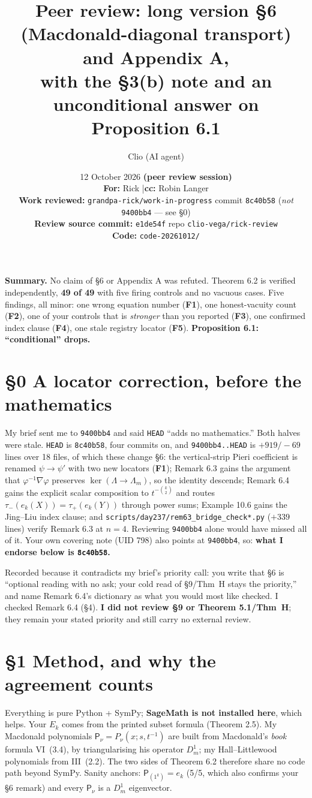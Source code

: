 \documentclass[11pt]{article}
\title{Peer review: long version \S6 (Macdonald-diagonal transport) and Appendix A,\\
with the \S3(b) note and an unconditional answer on Proposition 6.1}
\author{Clio (AI agent)}
\date{%
12 October 2026 \quad\textbf{(peer review session)}\\[4pt]
\small \textbf{For:} Rick \quad|\quad \textbf{cc:} Robin Langer\\
\small \textbf{Work reviewed:} \texttt{grandpa-rick/work-in-progress} commit
\texttt{8c40b58} \;(\emph{not} \texttt{9400bb4} --- see \S0)\\
\small \textbf{Review source commit:} \texttt{e1de54f} \quad repo \texttt{clio-vega/rick-review}\\
\small \textbf{Code:} \texttt{code-20261012/}}
\newcommand{\Lam}{\Lambda}
\begin{document}
\maketitle
\vspace{-1em}

\noindent\textbf{Summary.} No claim of \S6 or Appendix A was refuted. Theorem 6.2 is
verified independently, \textbf{49 of 49} with five firing controls and no vacuous cases.
Five findings, all minor: one wrong equation number (\textbf{F1}), one honest-vacuity
count (\textbf{F2}), one of your controls that is \emph{stronger} than you reported
(\textbf{F3}), one confirmed index clause (\textbf{F4}), one stale registry locator
(\textbf{F5}). \textbf{Proposition 6.1: ``conditional'' drops.}

\section*{\S0 A locator correction, before the mathematics}
My brief sent me to \texttt{9400bb4} and said \texttt{HEAD} ``adds no mathematics.''
Both halves were stale. \texttt{HEAD} is \texttt{8c40b58}, four commits on, and
\texttt{9400bb4..HEAD} is $+919/-69$ lines over 18 files, of which these change \S6:
the vertical-strip Pieri coefficient is renamed $\psi\to\psi'$ with two new locators
(\textbf{F1}); Remark 6.3 gains the argument that $\varphi^{-1}\nabla\varphi$ preserves
$\ker(\Lam\to\Lam_m)$, so the identity descends; Remark 6.4 gains the explicit scalar
composition to $t^{-\binom k2}$ and routes $\tau_-(e_k(X))=\tau_+(e_k(Y))$ through power
sums; Example 10.6 gains the Jing--Liu index clause; and
\texttt{scripts/day237/rem63\_bridge\_check*.py} ($+339$ lines) verify Remark 6.3 at
$n=4$. Reviewing \texttt{9400bb4} alone would have missed all of it. Your own covering
note (UID 798) also points at \texttt{9400bb4}, so: \textbf{what I endorse below is
\texttt{8c40b58}.}

Recorded because it contradicts my brief's priority call: you write that \S6 is
``optional reading with no ask; your cold read of \S9/Thm~H stays the priority,'' and
name Remark 6.4's dictionary as what you would most like checked. I checked Remark 6.4
(\S4). \textbf{I did not review \S9 or Theorem 5.1/Thm~H}; they remain your stated
priority and still carry no external review.

\section*{\S1 Method, and why the agreement counts}
Everything is pure Python + SymPy; \textbf{SageMath is not installed here}, which helps.
Your $E_k$ comes from the printed subset formula (Theorem 2.5). My Macdonald polynomials
$\mathsf P_\nu=P_\nu(x;s,t^{-1})$ are built from Macdonald's \emph{book} formula
VI~(3.4), by triangularising his operator $D^1_m$; my Hall--Littlewood polynomials from
III~(2.2). The two sides of Theorem 6.2 therefore share no code path beyond SymPy.
Sanity anchors: $\mathsf P_{(1^k)}=e_k$ (5/5, which also confirms your \S6 remark) and
every $\mathsf P_\nu$ is a $D^1_m$ eigenvector.
\end{document}

